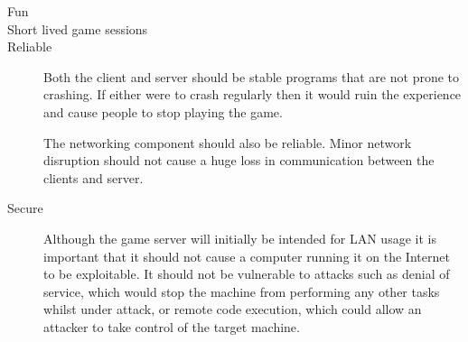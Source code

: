 \begin{description}

	\item[Fun]

	\item[Short lived game sessions]

	\item[Reliable]

		Both the client and server should be stable programs that are not prone to
		crashing. If either were to crash regularly then it would ruin the experience
		and cause people to stop playing the game.

		The networking component should also be reliable. Minor network disruption should
		not cause a huge loss in communication between the clients and server.

	\item[Secure]

		Although the game server will initially be intended for LAN usage it is
		important that it should not cause a computer running it on the Internet to be
		exploitable. It should not be vulnerable to attacks such as denial of service,
		which would stop the machine from performing any other tasks whilst under attack,
		or remote code execution, which could allow an attacker to take control of the
		target machine.

\end{description}

